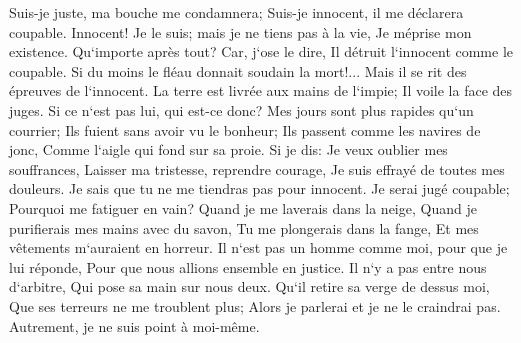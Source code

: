 \verse Suis-je juste, ma bouche me condamnera; Suis-je innocent, il me déclarera coupable. 
\verse Innocent! Je le suis; mais je ne tiens pas à la vie, Je méprise mon existence. 
\verse Qu`importe après tout? Car, j`ose le dire, Il détruit l`innocent comme le coupable. 
\verse Si du moins le fléau donnait soudain la mort!... Mais il se rit des épreuves de l`innocent. 
\verse La terre est livrée aux mains de l`impie; Il voile la face des juges. Si ce n`est pas lui, qui est-ce donc? 
\verse Mes jours sont plus rapides qu`un courrier; Ils fuient sans avoir vu le bonheur; 
\verse Ils passent comme les navires de jonc, Comme l`aigle qui fond sur sa proie. 
\verse Si je dis: Je veux oublier mes souffrances, Laisser ma tristesse, reprendre courage, 
\verse Je suis effrayé de toutes mes douleurs. Je sais que tu ne me tiendras pas pour innocent. 
\verse Je serai jugé coupable; Pourquoi me fatiguer en vain? 
\verse Quand je me laverais dans la neige, Quand je purifierais mes mains avec du savon, 
\verse Tu me plongerais dans la fange, Et mes vêtements m`auraient en horreur. 
\verse Il n`est pas un homme comme moi, pour que je lui réponde, Pour que nous allions ensemble en justice. 
\verse Il n`y a pas entre nous d`arbitre, Qui pose sa main sur nous deux. 
\verse Qu`il retire sa verge de dessus moi, Que ses terreurs ne me troublent plus; 
\verse Alors je parlerai et je ne le craindrai pas. Autrement, je ne suis point à moi-même. 

